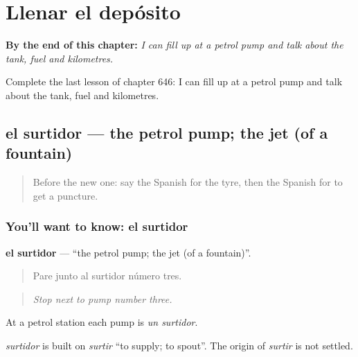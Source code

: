 
\chapter{Llenar el depósito}
\label{ch:es-llenar-el-deposito}

\begin{chapteropening}
\textbf{By the end of this chapter:} \emph{I can fill up at a petrol pump and talk about the tank, fuel and kilometres.}

Complete the last lesson of chapter 646: I can fill up at a petrol pump and talk about the tank, fuel and kilometres.
\end{chapteropening}

\section[el surtidor]{el surtidor — the petrol pump; the jet (of a fountain)}

\label{lesson:ES-C646-surtidor}



\begin{quote}
Before the new one: say the Spanish for the tyre, then the Spanish for to get a puncture.
\end{quote}

\subsection*{You'll want to know: el surtidor}
\textbf{el surtidor} — \textquotedblleft{}the petrol pump; the jet (of a fountain)\textquotedblright{}.

\begin{quote}
Pare junto al surtidor número tres.
\end{quote}

\begin{quote}
\emph{Stop next to pump number three.}
\end{quote}

At a petrol station each pump is \emph{un surtidor}.

\begin{cousinweb}
\emph{surtidor} is built on \emph{surtir} \textquotedblleft{}to supply; to spout\textquotedblright{}. The origin of \emph{surtir} is not settled.
\end{cousinweb}

